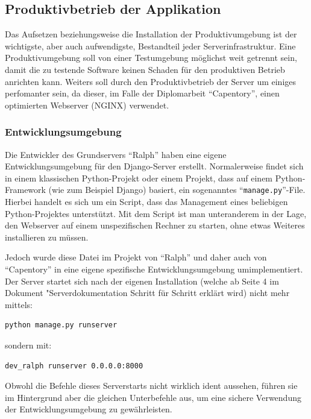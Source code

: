 \hypertarget{produktivbetrieb-der-applikation}{%
\subsection{Produktivbetrieb der
Applikation}\label{produktivbetrieb-der-applikation}}

Das Aufsetzen beziehungsweise die Installation der Produktivumgebung ist
der wichtigste, aber auch aufwendigste, Bestandteil jeder
Serverinfrastruktur. Eine Produktivumgebung soll von einer Testumgebung
möglichst weit getrennt sein, damit die zu testende Software keinen
Schaden für den produktiven Betrieb anrichten kann. Weiters soll durch
den Produktivbetrieb der Server um einiges perfomanter sein, da dieser,
im Falle der Diplomarbeit ``Capentory'', einen optimierten Webserver
(NGINX) verwendet.

\hypertarget{entwicklungsumgebung}{%
\subsubsection{Entwicklungsumgebung}\label{entwicklungsumgebung}}

Die Entwickler des Grundservers ``Ralph'' haben eine eigene
Entwicklungsumgebung für den Django-Server erstellt. Normalerweise
findet sich in einem klassischen Python-Projekt oder einem Projekt, dass
auf einem Python-Framework (wie zum Beispiel Django) basiert, ein
sogenanntes ``\texttt{manage.py}''-File. Hierbei handelt es sich um ein
Script, dass das Management eines beliebigen Python-Projektes
unterstützt. Mit dem Script ist man unteranderem in der Lage, den
Webserver auf einem unspezifischen Rechner zu starten, ohne etwas
Weiteres installieren zu müssen.

Jedoch wurde diese Datei im Projekt von ``Ralph'' und daher auch von
``Capentory'' in eine eigene spezifische Entwicklungsumgebung
umimplementiert. Der Server startet sich nach der eigenen Installation
(welche ab Seite 4 im Dokument "Serverdokumentation Schritt für Schritt
erklärt wird) nicht mehr mittels:

\begin{verbatim}
python manage.py runserver
\end{verbatim}

sondern mit:

\begin{verbatim}
dev_ralph runserver 0.0.0.0:8000
\end{verbatim}

Obwohl die Befehle dieses Serverstarts nicht wirklich ident aussehen,
führen sie im Hintergrund aber die gleichen Unterbefehle aus, um eine
sichere Verwendung der Entwicklungsumgebung zu gewährleisten.

